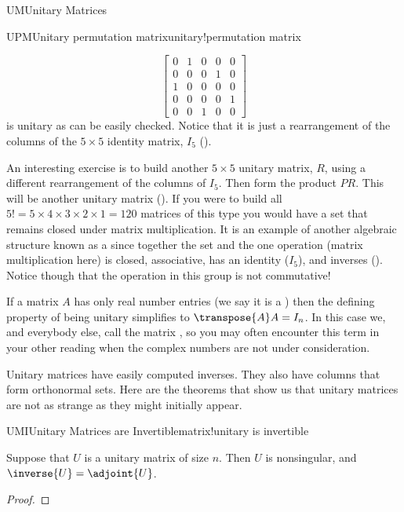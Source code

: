 \begin{subsect}{UM}{Unitary Matrices}
\begin{example}{UPM}{Unitary permutation matrix}{unitary!permutation matrix}
\begin{para}
\begin{equation*}
\begin{bmatrix}
0&1&0&0&0\\
0&0&0&1&0\\
1&0&0&0&0\\
0&0&0&0&1\\
0&0&1&0&0
\end{bmatrix}
\end{equation*}
%
is unitary as can be easily checked.  Notice that it is just a rearrangement of the columns of the $5\times 5$ identity matrix, $I_5$ ().\end{para}
%
\begin{para}An interesting exercise is to build another $5\times 5$ unitary matrix, $R$, using a different rearrangement of the columns of $I_5$.  Then form the product $PR$.  This will be another unitary matrix ().  If you were to build all $5!=5\times 4\times 3\times 2\times 1=120$ matrices of this type you would have a set that remains closed under matrix multiplication.  It is an example of another algebraic structure known as a  since together the set and the one operation (matrix multiplication here) is closed, associative, has an identity ($I_5$), and inverses ().  Notice though that the operation in this group is not commutative!\end{para}
%
\end{example}
%
\begin{para}If a matrix $A$ has only real number entries (we say it is a ) then the defining property of being unitary simplifies to $\transpose{A}A=I_n$.  In this case we, and everybody else, call the matrix , so you may often encounter this term in your other reading when the complex numbers are not under consideration.\end{para}
%
\begin{para}Unitary matrices have easily computed inverses.  They also have columns that form orthonormal sets.  Here are the theorems that show us that unitary matrices are not as strange as they might initially appear.\end{para}
%
\begin{theorem}{UMI}{Unitary Matrices are Invertible}{matrix!unitary is invertible}
\begin{para}Suppose that $U$ is a unitary matrix of size $n$.  Then $U$ is nonsingular, and $\inverse{U}=\adjoint{U}$.\end{para}
\end{theorem}
%
\begin{proof}

\end{proof}
\end{subsect}
